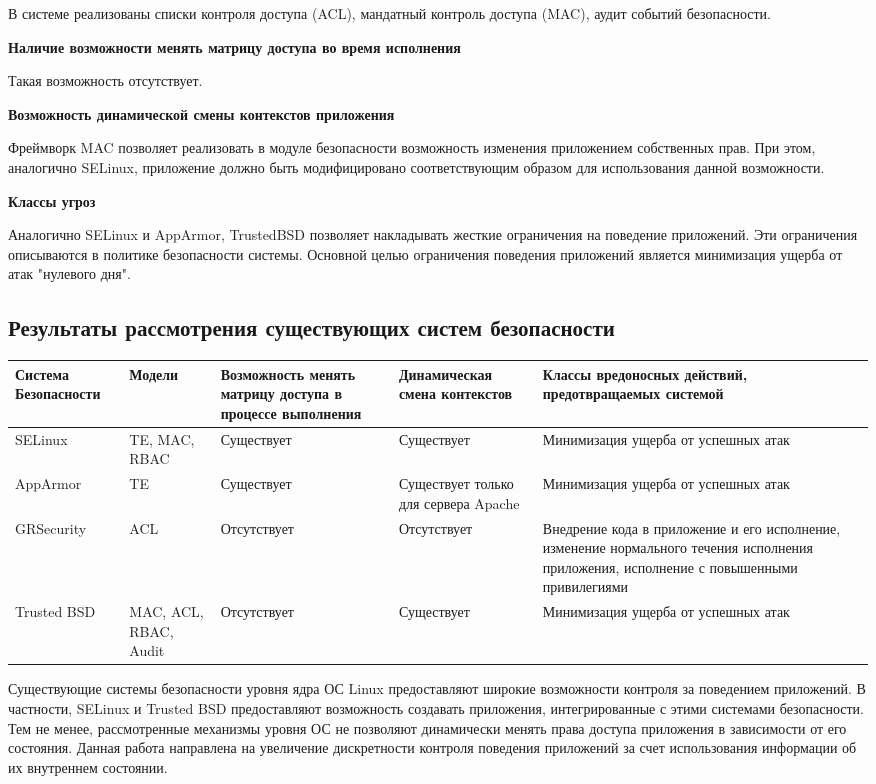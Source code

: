 В системе реализованы списки контроля доступа (ACL), 
мандатный контроль доступа (MAC), аудит событий
безопасности. 

\bigskip
{\bfseries Наличие возможности менять матрицу доступа 
	 во время исполнения } 
	 
Такая возможность отсутствует. 

\bigskip  
{\bfseries Возможность динамической смены контекстов приложения} 

Фреймворк MAC позволяет реализовать в модуле 
безопасности возможность изменения приложением 
собственных прав. При этом, аналогично SELinux, 
приложение должно быть модифицировано соответствующим 
образом для использования данной возможности. 

\bigskip
{\bfseries Классы угроз} 

Аналогично SELinux и AppArmor, TrustedBSD позволяет 
накладывать жесткие ограничения на поведение приложений. 
Эти ограничения описываются в политике безопасности системы.
Основной целью ограничения поведения приложений является 
минимизация ущерба от атак "нулевого дня". 

\newpage
\subsection{Результаты рассмотрения существующих 
систем безопасности} 

\begin{scriptsize}
\bigskip
\begin{center}
\begin{tabular}{|p{2cm}|p{2.5cm}|p{3cm}|p{3cm}|p{3cm}|} 
\hline
Система Безопасности & Модели & Возможность менять матрицу 
доступа в процессе выполнения & 
Динамическая смена контекстов & Классы вредоносных действий,
предотвращаемых системой \\
\hline 
SELinux & TE, MAC, RBAC & Существует & Существует & 
Минимизация ущерба от успешных атак \\
\hline
AppArmor & TE & Существует & Существует только для сервера Apache & 
Минимизация ущерба от успешных атак \\ 
\hline 
GRSecurity & ACL & Отсутствует & Отсутствует & Внедрение кода в приложение 
и его исполнение, изменение нормального течения исполнения приложения, 
исполнение с повышенными привилегиями \\ 
\hline 
Trusted BSD & MAC, ACL, RBAC, Audit & Отсутствует & Существует & 
Минимизация ущерба от успешных атак \\ 
\hline
\end{tabular} 
\end{center} 
\end{scriptsize} 


\bigskip
Существующие системы безопасности уровня ядра ОС Linux 
предоставляют широкие возможности контроля за поведением 
приложений. В частности, SELinux и Trusted BSD 
 предоставляют возможность 
создавать приложения, интегрированные с этими системами 
безопасности. Тем не менее, рассмотренные механизмы уровня 
ОС не позволяют динамически менять права доступа приложения 
в зависимости от его состояния. Данная работа направлена на 
увеличение дискретности контроля поведения приложений за счет 
использования информации об их внутреннем состоянии. 
\bigskip
